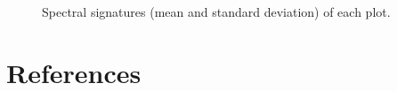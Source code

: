 \documentclass[review]{elsarticle}
\begin{document}
\begin{figure} [H]
	\begin{center}
		\caption{Spectral signatures (mean and standard deviation) of each plot.}
		\label{fig:spectral_signatures}
	\end{center}
\end{figure}

\pagebreak

\section*{References}


\end{document}
